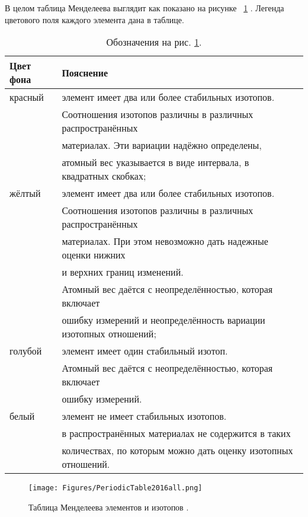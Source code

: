 \documentclass[a5paper,openany]{book}
\begin{document}
В целом таблица Менделеева выглядит как показано на рисунке ~\ref{f:PeriodicTable} \cite{IUPAC}.
Легенда цветового поля каждого элемента дана в таблице.\\
\begin{table}
{\small
\begin{tabular}{ll}
	Цвет фона & Пояснение \\
	\hline	
	красный & элемент имеет два или более стабильных изотопов. \\
	~ &	Соотношения изотопов различны в различных распространённых  \\
	~& материалах. Эти вариации надёжно определены, \\
	~&  атомный вес указывается в виде интервала, в квадратных скобках; \\
	\hline
	жёлтый & элемент имеет два или более стабильных изотопов. \\
	~ & Соотношения изотопов различны в различных распространённых  \\
	~ & материалах. При этом невозможно дать надежные оценки нижних  \\
	~& и верхних границ изменений. \\
	~ & Атомный вес даётся с неопределённостью, которая включает  \\
	~ & ошибку измерений и неопределённость вариации изотопных отношений; \\
	\hline
	голубой& элемент имеет один стабильный изотоп.  \\
	~ & Атомный вес даётся с неопределённостью, которая включает\\ 
	~ & ошибку измерений. \\
	\hline	
	белый & элемент не имеет стабильных изотопов.	\\
	~ & в распространённых материалах не содержится в таких  \\
	~ & количествах, по которым можно дать оценку изотопных отношений.\\
	\hline
\end{tabular} 
\caption{Обозначения на рис. \ref{f:PeriodicTable}.}
}
\end{table}

\begin{figure}[ht] 
	\centering\small
	\unitlength=1mm
	\texttt{[image: Figures/PeriodicTable2016all.png]} 
	\caption{Таблица Менделеева элементов и изотопов \cite{IUPAC}.} 
	\label{f:PeriodicTable}
\end{figure}

\end{document}
